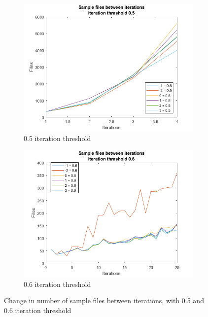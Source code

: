 \begin{figure}
    \centering
    \begin{subfigure}[b]{.45\textwidth}
        \centering
        \includegraphics[width=\textwidth]{figures/iterfiles-0.5.png}
        \caption{0.5 iteration threshold}
        \label{sfig:iter:iterfiles0.5}
    \end{subfigure}
    \hfill
    \begin{subfigure}[b]{.45\textwidth}
        \centering
        \includegraphics[width=\textwidth]{figures/iterfiles-0.6.png}
        \caption{0.6 iteration threshold}
        \label{sfig:iter:iterfiles0.6}
    \end{subfigure}
    \caption{Change in number of sample files between iterations, with 0.5 and 0.6 iteration threshold}
    \label{fig:iter:iterfiles0.50.6}
\end{figure}


